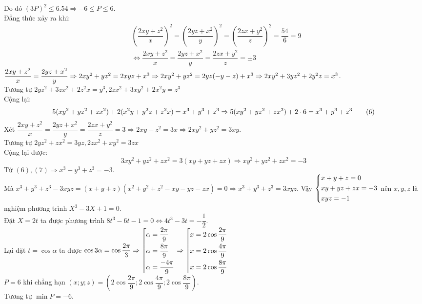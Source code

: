 \begin{bt}
{		Do đó $ (3P)^2 \le 6.54 \Rightarrow -6\le P \le 6 $.\\
		Đẳng thức xảy ra khi:
		{\allowdisplaybreaks	
			\begin{align*}
			&\left(\dfrac{2xy+z^2}{x} \right)^2=   \left(\dfrac{2yz+x^2}{y} \right)^2= \left(\dfrac{2zx+y^2}{z} \right)^2= \dfrac{54}{6}=9\\
			& \Leftrightarrow \dfrac{2xy+z^2}{x}= \dfrac{2yz+x^2}{y} = \dfrac{2zx+y^2}{z} =\pm 3
			\end{align*}}
		$ \dfrac{2xy+z^2}{x}= \dfrac{2yz+x^2}{y} \Rightarrow 2xy^2 + yz^2 = 2xyz + x^3 \Rightarrow 2xy^2 + yz^2 = 2yz (-y - z) + x^3\\ \Rightarrow 2xy^2 + 3yz^2 + 2y^2z = x^3$.\\
		Tương tự $ 2yz^2 + 3zx^2 + 2z^2x = y^3, 2zx^2 + 3xy^2 + 2x^2y = z^3 $\\
		Cộng lại: \[
		5 (xy^2 + yz^2 + zx^2)+ 2 (x^2y + y^2z + z^2x)= x^3 + y^3 + z^3\\
		\Rightarrow 5 (xy^2 + yz^2 + zx^2)+ 2 \cdot 6= x^3 + y^3 + z^3 \tag{6}
		\]
		Xét $ \dfrac{2xy+z^2}{x}= \dfrac{2yz+x^2}{y} = \dfrac{2zx+y^2}{z} =3 \Rightarrow   2xy + z^2 = 3x \Rightarrow 2xy^2 + yz^2 = 3xy$.\\
		Tương tự $ 2yz^2 + zx^2 = 3yz, 2zx^2 + xy^2 = 3zx $\\
		Cộng lại được: \[ 3 xy^2 + yz^2 + zx^2 = 3 (xy + yz + zx) \Rightarrow xy^2 + yz^2 + zx^2 = -3 \tag{7} \]
		Từ $ (6),(7)\Rightarrow x^3 + y^3 + z^3 = -3 $.\\
		Mà $ x^3 + y^3 + z^3 - 3xyz = (x + y + z)( x^2 + y^2 + z^2 - xy - yz - zx)= 0 \Rightarrow x^3 + y^3 +
		z^3 = 3xyz. $
		Vậy $ \left\{\begin{aligned}&x+y+z=0\\&xy+yz+zx=-3\\&xyz=-1\end{aligned}\right. $ nên $ x,y,z $ là nghiệm phương trình
		$ X^3-3X+1=0 $.\\
		Đặt $ X=2t $ ta được phương trình $ 8t^3-6t-1=0 \Leftrightarrow 4t^3-3t=-\dfrac{1}{2} $.\\ Lại đặt $ t=\cos \alpha $ ta được $ \cos 3\alpha=\cos\dfrac{2\pi}{3} \Rightarrow \left[\begin{aligned}&\alpha=\dfrac{2\pi}{9}\\&\alpha=\dfrac{8\pi}{9}\\&\alpha=\dfrac{-4\pi}{9}\end{aligned}\right.\Rightarrow \left[\begin{aligned}&x=2\cos\dfrac{2\pi}{9}\\&x=2\cos\dfrac{4\pi}{9}\\&x=2\cos\dfrac{8\pi}{9}\end{aligned}\right.$\\
		$ P = 6 $ khi chẳng hạn $ (x; y; z) = \left(2\cos \dfrac{2\pi}{9};2\cos \dfrac{4\pi}{9};2\cos \dfrac{8\pi}{9} \right)  $.\\
		Tương tự $ \min P=-6 $.
	}
\end{bt}


